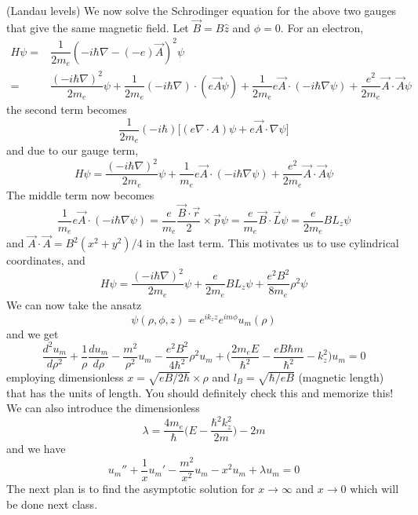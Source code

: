 \begin{lem}
(Landau levels) We now solve the Schrodinger equation for the above two gauges that give the same magnetic field. Let $\vec{B}=B\hat{z}$ and $\phi =0$. For an electron,
\[\begin{align*}
H\psi =&\dfrac{1}{2m_{e}}(-i\hbar \nabla -(-e)\vec{A})^2\psi \\
=&\dfrac{(-i\hbar \nabla )^2}{2m_{e}}\psi +\dfrac{1}{2m_{e}}(-i\hbar \nabla )\cdot (e\vec{A}\psi )+\dfrac{1}{2m_{e}}e\vec{A}\cdot (-i\hbar \nabla \psi )+\dfrac{e^2}{2m_{e}}\vec{A}\cdot \vec{A}\psi 
\end{align*}\]
the second term becomes  
\[\dfrac{1}{2m_{e}}(-i\hbar )\Big[(e\nabla \cdot A)\psi+e\vec{A}\cdot \nabla \psi  \Big]\]
and due to our gauge term,
\[H\psi =\dfrac{(-i\hbar \nabla )^2}{2m_{e}}\psi +\dfrac{1}{m_{e}}e\vec{A}\cdot (-i\hbar \nabla \psi )+\dfrac{e^2}{2m_{e}}\vec{A}\cdot \vec{A}\psi \]
The middle term now becomes
\[\dfrac{1}{m_{e}}e\vec{A}\cdot (-i\hbar \nabla \psi )=\dfrac{e}{m_{e}}\dfrac{\vec{B}\cdot \vec{r}}{2}\times \vec{p}\psi =\dfrac{e}{m_{e}}\vec{B}\cdot \vec{L}\psi =\dfrac{e}{2m_{e}}BL_{z}\psi \]
and $\vec{A}\cdot \vec{A}=B^2(x^2+y^2)/4$ in the last term. This motivates us to use cylindrical coordinates, and
\[H\psi =\dfrac{(-i\hbar \nabla )^2}{2m_{e}}\psi +\dfrac{e}{2m_{e}}BL_{z}\psi +\dfrac{e^2B^2}{8m_{e}}\rho ^2\psi \]
We can now take the ansatz
\[\psi (\rho ,\phi ,z)=e^{ik_{z}z}e^{im\phi }u_{m}(\rho )\]
and we get
\[\dfrac{d ^2u_{m}}{d \rho ^2}+\dfrac{1}{\rho }\dfrac{d u_{m}}{d \rho }-\dfrac{m^2}{\rho ^2}u_{m} -\dfrac{e^2B^2}{4\hbar ^2}\rho ^2u_{m}+\Big(\dfrac{2m_{e}E}{\hbar ^2}-\dfrac{eB\hbar m}{\hbar ^2}-k_{z}^2\Big)u_{m}=0 \]
employing dimensionless $x=\sqrt{eB/2\hbar }\times \rho $ and $l_{B}=\sqrt{\hbar /eB}$ (magnetic length) that has the units of length. You should definitely check this and memorize this! We can also introduce the dimensionless
\[\lambda =\dfrac{4m_{e}}{\hbar }\Big(E-\dfrac{\hbar^2k_{z}^2}{2m}\Big)-2m\]
and we have 
\[u_{m}''+\dfrac{1}{x}u_{m}'-\dfrac{m^2}{x^2}u_{m}-x^2u_{m}+\lambda u_{m}=0\]
The next plan is to find the asymptotic solution for $x\rightarrow \infty $ and $x\rightarrow 0$ which will be done next class. 
\end{lem}
\vspace{2ex}

